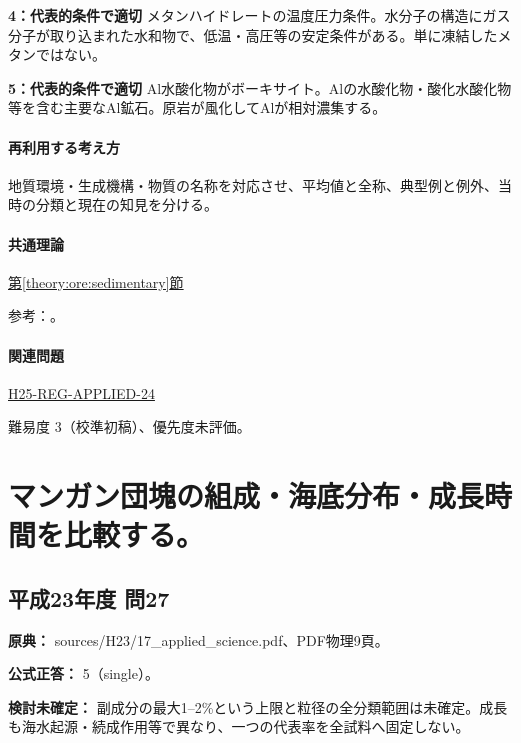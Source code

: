 \noindent\textbf{4：代表的条件で適切} メタンハイドレートの温度圧力条件。水分子の構造にガス分子が取り込まれた水和物で、低温・高圧等の安定条件がある。単に凍結したメタンではない。\par

\noindent\textbf{5：代表的条件で適切} Al水酸化物がボーキサイト。Alの水酸化物・酸化水酸化物等を含む主要なAl鉱石。原岩が風化してAlが相対濃集する。\par

\paragraph{再利用する考え方} 地質環境・生成機構・物質の名称を対応させ、平均値と全称、典型例と例外、当時の分類と現在の知見を分ける。

\paragraph{共通理論} \hyperref[theory:ore:sedimentary]{第\ref*{theory:ore:sedimentary}節}

\par 参考：\cite{ore50_oilshale_ref,ore50_bauxite_ref,ore50_bif_ref}。

\paragraph{関連問題} \hyperref[q:h25-reg-applied-24]{H25-REG-APPLIED-24}

\par 難易度 3（校準初稿）、優先度未評価。

\section{マンガン団塊の組成・海底分布・成長時間を比較する。}

\subsection{平成23年度 問27}
\label{q:h23-reg-applied-27}

\noindent\textbf{原典：} sources/H23/17\_applied\_science.pdf、PDF物理9頁。

\textbf{公式正答：} 5（single）。

\par\textbf{検討未確定：} 副成分の最大1–2\%という上限と粒径の全分類範囲は未確定。成長も海水起源・続成作用等で異なり、一つの代表率を全試料へ固定しない。

